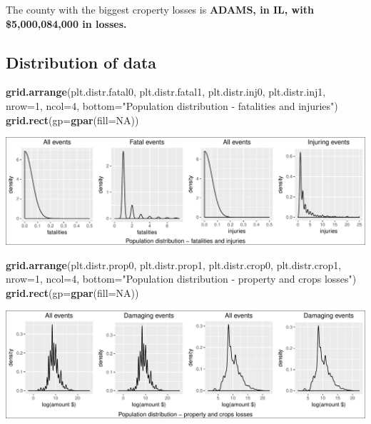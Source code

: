 \documentclass[]{article}
\newenvironment{Shaded}{\begin{snugshade}}{\end{snugshade}}
\newcommand{\KeywordTok}[1]{\textcolor[rgb]{0.13,0.29,0.53}{\textbf{{#1}}}}
\newcommand{\DataTypeTok}[1]{\textcolor[rgb]{0.13,0.29,0.53}{{#1}}}
\newcommand{\DecValTok}[1]{\textcolor[rgb]{0.00,0.00,0.81}{{#1}}}
\newcommand{\StringTok}[1]{\textcolor[rgb]{0.31,0.60,0.02}{{#1}}}
\newcommand{\OtherTok}[1]{\textcolor[rgb]{0.56,0.35,0.01}{{#1}}}
\newcommand{\NormalTok}[1]{{#1}}
\begin{document}
The county with the biggest croperty losses is \textbf{ADAMS, in IL,
with \$5,000,084,000 in losses.}

\subsection{Distribution of data}\label{distribution-of-data}

\begin{Shaded}
\begin{Highlighting}[]
\KeywordTok{grid.arrange}\NormalTok{(plt.distr.fatal0, plt.distr.fatal1, plt.distr.inj0, plt.distr.inj1, }
             \DataTypeTok{nrow=}\DecValTok{1}\NormalTok{, }\DataTypeTok{ncol=}\DecValTok{4}\NormalTok{, }
             \DataTypeTok{bottom=}\StringTok{"Population distribution - fatalities and injuries"}\NormalTok{)}
\KeywordTok{grid.rect}\NormalTok{(}\DataTypeTok{gp=}\KeywordTok{gpar}\NormalTok{(}\DataTypeTok{fill=}\OtherTok{NA}\NormalTok{))             }
\end{Highlighting}
\end{Shaded}

\includegraphics{readme_files/figure-latex/distribution-1.pdf}

\begin{Shaded}
\begin{Highlighting}[]
\KeywordTok{grid.arrange}\NormalTok{(plt.distr.prop0, plt.distr.prop1, plt.distr.crop0, plt.distr.crop1, }
             \DataTypeTok{nrow=}\DecValTok{1}\NormalTok{, }\DataTypeTok{ncol=}\DecValTok{4}\NormalTok{, }
             \DataTypeTok{bottom=}\StringTok{"Population distribution - property and crops losses"}\NormalTok{)}
\KeywordTok{grid.rect}\NormalTok{(}\DataTypeTok{gp=}\KeywordTok{gpar}\NormalTok{(}\DataTypeTok{fill=}\OtherTok{NA}\NormalTok{))   }
\end{Highlighting}
\end{Shaded}

\includegraphics{readme_files/figure-latex/distribution-2.pdf}
\end{document}
